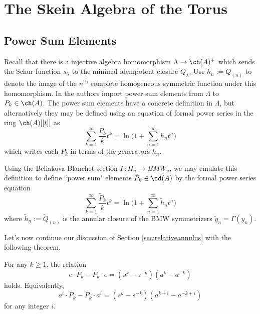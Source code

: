 \chapter{The Skein Algebra of the Torus}



\section{Power Sum Elements}

Recall that there is a injective algebra homomorphism $\Lambda \to \ch(A)^+$ which sends the Schur function $s_\lambda$ to the minimal idempotent closure $Q_\lambda$. Use $h_n := Q_{(n)}$ to denote the image of the $n^\textrm{th}$ complete homogeneous symmetric function under this homomorphism. In  the authors import power sum elements from $\Lambda$ to $P_k \in \ch(A)$. The power sum elements have a concrete definition in $\Lambda$, but alternatively they may be defined using an equation of formal power series in the ring $\ch(A)[[t]]$ as
\begin{equation}
\sum_{k=1}^\infty \frac{P_k}{k} t^k = \ln \Bigg( 1 + \sum_{n=1}^\infty h_n t^n \Bigg)
\end{equation}
which writes each $P_k$ in terms of the generators $h_n$. 

Using the Beliakova-Blanchet section $\Gamma: H_n \to BMW_n$, we may emulate this definition to define ``power sum" elements $\tilde{P}_k \in \cd(A)$ by the formal power series equation
\begin{equation}
\sum_{k=1}^\infty \frac{\tilde{P}_k}{k} t^k = \ln \Bigg( 1 + \sum_{n=1}^\infty \tilde{h}_n t^n \Bigg)
\end{equation}
where $\tilde{h}_n := \tilde{Q}_{(n)}$ is the annular closure of the BMW symmetrizers $\tilde{y}_n = \Gamma(y_n)$.

Let's now continue our discussion of Section \ref{sec:relativeannulus} with the following theorem.

\begin{theorem} \label{thm:powersumcommutator}
For any $k \geq 1$, the relation
\begin{equation} \label{eq:powersumcommutator}
e \cdot \tilde{P}_k - \tilde{P}_k \cdot e = (s^k - s^{-k}) (a^k - a^{-k})
\end{equation}
holds. Equivalently,
\begin{equation}
a^i \cdot \tilde{P}_k - \tilde{P}_k \cdot a^i = (s^k - s^{-k}) (a^{k+i} - a^{-k+i})
\end{equation}
for any integer $i$.
\end{theorem}

